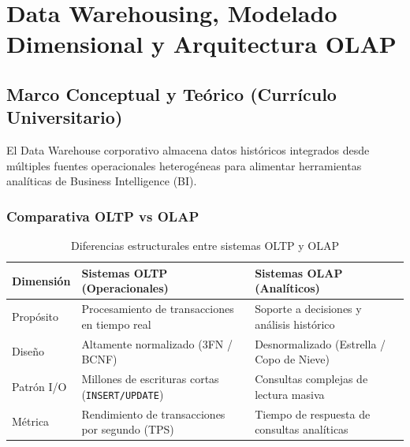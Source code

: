 \chapter{Data Warehousing, Modelado Dimensional y Arquitectura OLAP}
\label{cap:data_warehouse_modelado_dimensional}

\section{Marco Conceptual y Te\'orico (Curr\'iculo Universitario)}

El Data Warehouse corporativo almacena datos hist\'oricos integrados desde m\'ultiples fuentes operacionales heterog\'eneas para alimentar herramientas anal\'iticas de Business Intelligence (BI).

\subsection{Comparativa OLTP vs OLAP}
\begin{table}[h!]
\centering
\small
\begin{tabularx}{\textwidth}{lXX}
\toprule
\textbf{Dimensi\'on} & \textbf{Sistemas OLTP (Operacionales)} & \textbf{Sistemas OLAP (Anal\'iticos)} \\
\midrule
Prop\'osito & Procesamiento de transacciones en tiempo real & Soporte a decisiones y an\'alisis hist\'orico \\
Dise\~no & Altamente normalizado (3FN / BCNF) & Desnormalizado (Estrella / Copo de Nieve) \\
Patr\'on I/O & Millones de escrituras cortas (\texttt{INSERT/UPDATE}) & Consultas complejas de lectura masiva \\
M\'etrica & Rendimiento de transacciones por segundo (TPS) & Tiempo de respuesta de consultas anal\'iticas \\
\bottomrule
\end{tabularx}
\caption{Diferencias estructurales entre sistemas OLTP y OLAP}
\end{table}


